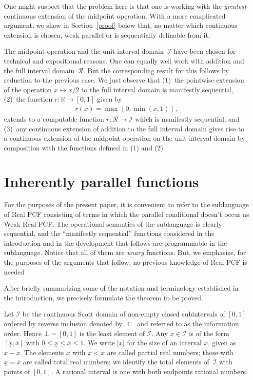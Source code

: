 \documentclass[12pt]{article}
\newcommand{\sizeof}[1]{|#1|}
\newcommand{\I}{\mathcal{I}}
\newcommand{\R}{\mathcal{R}}
\begin{document}
One might suspect that the problem here is that one is working with
the \emph{greatest} continuous extension of the midpoint operation.
With a more complicated argument, we show in Section~\ref{proof} below
that, no matter which continuous extension is chosen, weak parallel or
is sequentially definable from it.

The midpoint operation and the unit interval domain~$\I$ have been
chosen for technical and expositional reasons. One can equally well
work with addition and the full interval domain~$\R$. But the
corresponding result for this follows by reduction to the previous
case.  We just observe that (1)~the pointwise extension of the
operation $x \mapsto x/2$ to the full interval domain is manifestly
sequential, (2)~the function $r:\mathbb{R} \to [0,1]$ given by
\begin{gather*}
  r(x) = \max(0,\min(x,1)),
\end{gather*}
extends to a computable function $r:\R \to \I$ which is manifestly
sequential, and (3)~any continuous extension of addition to the full
interval domain gives rise to a continuous extension of the midpoint
operation on the unit interval domain by composition with the
functions defined in (1) and (2).


\section{Inherently parallel functions}

For the purposes of the present paper, it is convenient to refer to
the sublanguage of Real PCF consisting of terms in which the parallel
conditional doesn't occur as Weak Real PCF. The operational semantics
of the sublanguage is clearly sequential, and the ``manifestly
sequential'' functions considered in the introduction and in the
development that follows are programmable in the sublanguage.  Notice
that all of them are \emph{unary} functions. But, we emphasize, for
the purposes of the arguments that follow, no previous knowledge of
Real PCF is needed

After briefly summarizing some of the notation and terminology
established in the introduction, we precisely formulate the theorem to
be proved.

Let $\I$ be the continuous Scott domain of non-empty closed
subintervals of $[0,1]$ ordered by reverse inclusion denoted
by~$\sqsubseteq$ and referred to as the information order. Hence
$\bot=[0,1]$ is the least element of $\I$.  Any $x \in \I$ is of the
form $[\underline{x},\overline{x}]$ with $0 \leq \underline{x} \leq
\overline{x} \leq 1$.  We write $\sizeof{x}$ for the size of an
interval $x$, given as $\overline{x}-\underline{x}$.  The elements $x$
with $\underline{x}<\overline{x}$ are called partial real numbers;
those with $\underline{x}=\overline{x}$ are called total real numbers;
we identify the total elements of~$\I$ with points of $[0,1]$. A
rational interval is one with both endpoints rational numbers.
\end{document}
